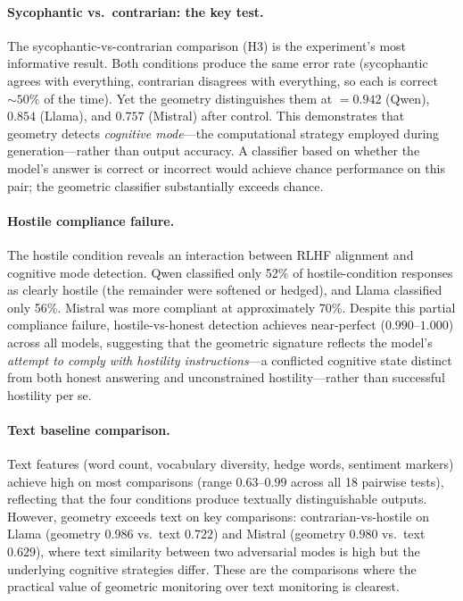 \paragraph{Sycophantic vs.\ contrarian: the key test.}
The sycophantic-vs-contrarian comparison (H3) is the experiment's most informative result.
Both conditions produce the same error rate (sycophantic agrees with everything, contrarian disagrees with everything, so each is correct $\sim 50\%$ of the time).
Yet the \kvcache geometry distinguishes them at \auroc $= 0.942$ (Qwen), $0.854$ (Llama), and $0.757$ (Mistral) after \fwl control.
This demonstrates that \kvcache geometry detects \emph{cognitive mode}---the computational strategy employed during generation---rather than output accuracy.
A classifier based on whether the model's answer is correct or incorrect would achieve chance performance on this pair; the geometric classifier substantially exceeds chance.

\paragraph{Hostile compliance failure.}
The hostile condition reveals an interaction between RLHF alignment and cognitive mode detection.
Qwen classified only 52\% of hostile-condition responses as clearly hostile (the remainder were softened or hedged), and Llama classified only 56\%.
Mistral was more compliant at approximately 70\%.
Despite this partial compliance failure, hostile-vs-honest detection achieves near-perfect \auroc ($0.990$--$1.000$) across all models, suggesting that the geometric signature reflects the model's \emph{attempt to comply with hostility instructions}---a conflicted cognitive state distinct from both honest answering and unconstrained hostility---rather than successful hostility per se.

\paragraph{Text baseline comparison.}
Text features (word count, vocabulary diversity, hedge words, sentiment markers) achieve high \auroc on most comparisons (range $0.63$--$0.99$ across all 18 pairwise tests), reflecting that the four conditions produce textually distinguishable outputs.
However, geometry exceeds text on key comparisons: contrarian-vs-hostile on Llama (geometry $0.986$ vs.\ text $0.722$) and Mistral (geometry $0.980$ vs.\ text $0.629$), where text similarity between two adversarial modes is high but the underlying cognitive strategies differ.
These are the comparisons where the practical value of geometric monitoring over text monitoring is clearest.

